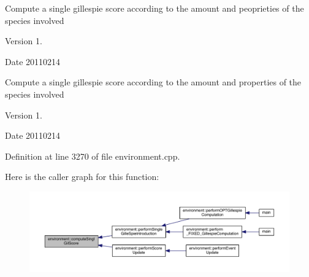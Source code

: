 Compute a single gillespie score according to the amount and peoprieties of the species involved \begin{DoxyVersion}{Version}
1. 
\end{DoxyVersion}
\begin{DoxyDate}{Date}
20110214
\end{DoxyDate}
Compute a single gillespie score according to the amount and properties of the species involved \begin{DoxyVersion}{Version}
1. 
\end{DoxyVersion}
\begin{DoxyDate}{Date}
20110214 
\end{DoxyDate}


Definition at line 3270 of file environment.\+cpp.



Here is the caller graph for this function\+:\nopagebreak
\begin{figure}[H]
\begin{center}
\leavevmode
\includegraphics[width=350pt]{a00013_ae1270b9c235dd6b28413075197dba8e0_icgraph}
\end{center}
\end{figure}


